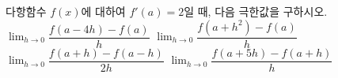 다항함수 $f(x)$에 대하여 $f'(a)=2$일 때, 다음 극한값을 구하시오.
 $\displaystyle\lim_{h\to 0}\dfrac{f(a-4h)-f(a)}{h}$
 $\displaystyle\lim_{h\to 0}\dfrac{f(a+h^2)-f(a)}{h}$
 $\displaystyle\lim_{h\to 0}\dfrac{f(a+h)-f(a-h)}{2h}$
 $\displaystyle\lim_{h\to 0}\dfrac{f(a+5h)-f(a+h)}{h}$
